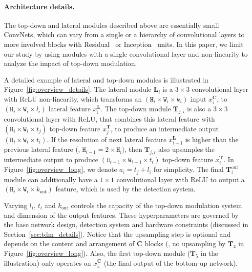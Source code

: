 \documentclass[10pt,twocolumn,letterpaper]{article}
\begin{document}
\vspace{-0.15in}
\paragraph{Architecture details.} The top-down and lateral modules described above are essentially small ConvNets, which can vary from a single or a hierarchy of convolutional layers to more involved blocks with Residual~\cite{resnet} or Inception~\cite{szegedy2016inception} units. In this paper, we limit our study by using modules with a single convolutional layer and non-linearity to analyze the impact of top-down modulation.

A detailed example of lateral and top-down modules is illustrated in Figure~\ref{fig:overview_details}. The lateral module $\mathbf{L}_i$ is a $3\times3$ convolutional layer with ReLU non-linearity, which transforms an $\left(\texttt{H}_i\times\texttt{W}_i\times k_i\right)$ input $x^\mathbf{C}_i$, to $\left(\texttt{H}_i\times\texttt{W}_i\times l_i\right)$ lateral feature $x^\mathbf{L}_i$. The top-down module $\mathbf{T}_{j,i}$ is also a $3\times3$ convolutional layer with ReLU, that combines this lateral feature with $\left(\texttt{H}_{i}\times\texttt{W}_{i}\times t_j\right)$ top-down feature $x^\mathbf{T}_{j}$, to produce an intermediate output $\left(\texttt{H}_{i}\times\texttt{W}_{i}\times t_{i}\right)$. If the resolution of next lateral feature $x^\mathbf{L}_{i-1}$ is higher than the previous lateral feature (\eg, $\texttt{H}_{i-1}= 2\times\texttt{H}_{i})$, then $\mathbf{T}_{j,i}$ also upsamples the intermediate output to produce $\left(\texttt{H}_{i-1}\times\texttt{W}_{i-1}\times t_{i}\right)$ top-down feature $x^\mathbf{T}_{i}$. In Figure~\ref{fig:overview_long}, we denote $a_i = t_j+l_i$ for simplicity. The final $\mathbf{T}^\text{out}_{i}$ module can additionally have a $1\times1$ convolutional layer with ReLU to output a $\left(\texttt{H}_i\times\texttt{W}_i\times k_{\text{out}}\right)$ feature, which is used by the detection system. 

Varying $l_i$, $t_i$ and $k_\text{out}$ controls the capacity of the top-down modulation system and dimension of the output features. These hyperparameters are governed by the base network design, detection system and hardware constraints (discussed in Section~\ref{sec:tdm_details}). Notice that the upsampling step is optional and depends on the content and arrangement of $\mathbf{C}$ blocks (\eg, no upsampling by $\mathbf{T}_4$ in Figure~\ref{fig:overview_long}). Also, the first top-down module ($\mathbf{T}_5$ in the illustration) only operates on $x^\mathbf{C}_5$ (the final output of the bottom-up network). 
\end{document}
